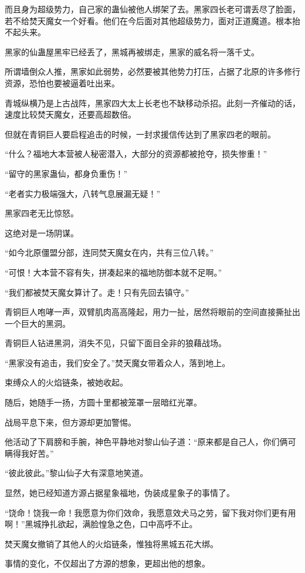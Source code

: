 \begin{this_body}
而且身为超级势力，自己家的蛊仙被他人绑架了去。黑家四长老可谓丢尽了脸面，若不给焚天魔女一个好看。他们在今后面对其他超级势力，面对正道魔道。根本抬不起头来。

黑家的仙蛊屋黑牢已经丢了，黑城再被绑走，黑家的威名将一落千丈。

所谓墙倒众人推，黑家如此弱势，必然要被其他势力打压，占据了北原的许多修行资源，恐怕也要被逼着吐出来。

青城纵横乃是上古战阵，黑家四大太上长老也不缺移动杀招。此刻一齐催动的话，速度比较焚天魔女，还要高超数倍。

但就在青铜巨人要启程追击的时候，一封求援信传达到了黑家四老的眼前。

“什么？福地大本营被人秘密潜入，大部分的资源都被抢夺，损失惨重！”

“留守的黑家蛊仙，都身负重伤！”

“老者实力极端强大，八转气息展漏无疑！”

黑家四老无比惊怒。

这绝对是一场阴谋。

“如今北原僵盟分部，连同焚天魔女在内，共有三位八转。”

“可恨！大本营不容有失，拼凑起来的福地防御本就不足啊。”

“我们都被焚天魔女算计了。走！只有先回去镇守。”

青铜巨人咆哮一声，双臂肌肉高高隆起，用力一扯，居然将眼前的空间直接撕扯出一个巨大的黑洞。

青铜巨人钻进黑洞，消失不见，只留下面目全非的狼藉战场。

“黑家没有追击，我们安全了。”焚天魔女带着众人，落到地上。

束缚众人的火焰链条，被她收起。

随后，她随手一扬，方圆十里都被笼罩一层暗红光罩。

战局平息下来，但方源却更加警惕。

他活动了下肩膀和手腕，神色平静地对黎山仙子道：“原来都是自己人，你们俩可瞒得我好苦。”

“彼此彼此。”黎山仙子大有深意地笑道。

显然，她已经知道方源占据星象福地，伪装成星象子的事情了。

“饶命！饶我一命！我愿意为你们效命，我愿意效犬马之劳，留下我对你们更有用啊！”黑城挣扎欲起，满脸惶急之色，口中高呼不止。

焚天魔女撤销了其他人的火焰链条，惟独将黑城五花大绑。

事情的变化，不仅超出了方源的想象，更超出他的想象。


\end{this_body}
